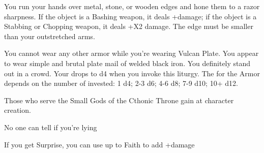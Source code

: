 {\LITURGY [
  Name= Hone,
  Link=vulcan-liturgy-hone,
  Paradigm= Force ,
  Save=  0 ,
  Duration= Combat or \SUMDICE Minutes ,
  Counter=  n/a  ,
  Keywords= Splittable ,
  Target=   Close objects
]



You run your hands over \DICE metal, stone, or wooden edges and hone them to a razor sharpness. If the object is a Bashing weapon, it deals +\DICE damage; if the object is a Stabbing or Chopping weapon, it deals +\DICE X2 damage. The edge must be smaller than your outstretched arms.

\LITURGY [
  Name= Vulcan Plate,
  Link=vulcan-liturgy-plate,
  Paradigm= Force ,
  Save=  N ,
  Duration= Session ,
  Counter=  n/a  ,
  Keywords= None ,
  Target=   Self
]



You cannot wear any other armor while you're wearing Vulcan Plate.  You appear to wear simple and brutal plate mail of welded black iron.  You definitely stand out in a crowd.  Your \MD drops to d4 when you invoke this liturgy.  The \UD for the Armor depends on the number of \DICE invested: 1 d4; 2-3 d6; 4-6 d8; 7-9 d10; 10+ d12.

\newpage





Those who serve the Small Gods of the Cthonic Throne gain \DCUP \DEX at character creation.





\GOD[
Name=Arioch,
Link=small-god-arioch,
GodOf=Fiend of Murder and Betrayal,
Holy=a silver coin with a face on each side
]


No one can tell if you're lying


If you get Surprise, you can use up to \LVL Faith to add +\SUMDICE damage





}
